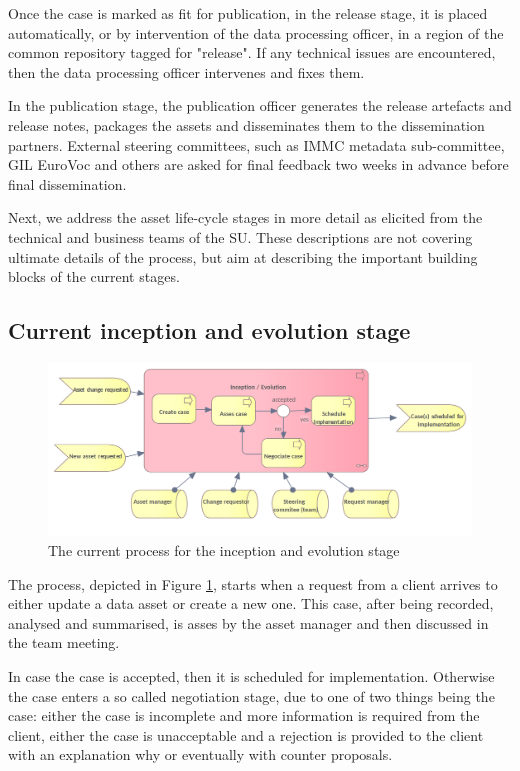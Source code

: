 	Once the case is marked as fit for publication, in the release stage, it is placed automatically, or by intervention of the data processing officer, in a region of the common repository tagged for "release". If any technical issues are encountered, then the data processing officer intervenes and fixes them.
	
	In the publication stage, the publication officer generates the release artefacts and release notes, packages the assets and disseminates them to the dissemination partners. External steering committees, such as IMMC metadata sub-committee, GIL EuroVoc and others are asked for final feedback two weeks in advance before final dissemination.
	
	Next, we address the asset life-cycle stages in more detail as elicited from the technical and business teams of the SU. These descriptions are not covering ultimate details of the process, but aim at describing the important building blocks of the current stages. 
	
	\subsection{Current inception and evolution stage}
	\label{sec:inception-current}
	
	\begin{figure}[h]
		\centering
		\includegraphics[width=.8\textwidth]{images/business/current/InceptionEvolution.png}
		\caption{The current process for the inception and evolution stage}
		\label{fig:evolution-current}
	\end{figure}		
	
	The process, depicted in Figure \ref{fig:evolution-current}, starts when a request from a client arrives to either update a data asset or create a new one. This case, after being recorded, analysed and summarised, is asses by the asset manager and then discussed in the team meeting. 
	
	
	In case the case is accepted, then it is scheduled for implementation. Otherwise the case enters a so called negotiation stage, due to one of two things being the case: either the case is incomplete and more information is required from the client, either the case is unacceptable and a rejection is provided to the client with an explanation why or eventually with counter proposals. 
	
